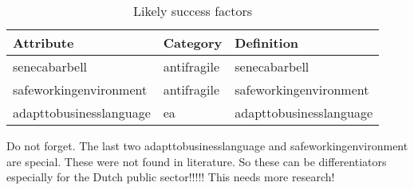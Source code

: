 \begin{longtable}{@{}p{}p{}p{}@{}}
	\textbf{Attribute} & \textbf{Category} & \textbf{Definition} \\%
	\midrule%
	\endhead%
	\hline
	\endfoot%
	\caption[Likely success factors]{Likely success factors}
	\label{tab:identifiedpossiblefactors}
	\endlastfoot%
	\Gls{senecabarbell} & \Gls{antifragile} & \Glsdesc*{senecabarbell} \\%
	\Gls{safeworkingenvironment} & \Gls{antifragile} & \Glsdesc*{safeworkingenvironment} \\%
	\Gls{adapttobusinesslanguage} & \acrlong{ea} & \Glsdesc*{adapttobusinesslanguage} \\%
	\bottomrule%
\end{longtable}%

\begin{remark}
	Do not forget. The last two \gls{adapttobusinesslanguage} and \gls{safeworkingenvironment} are special. These were not found in literature. So these can be differentiators especially for the Dutch public sector!!!!! This needs more research!
\end{remark}


%				

